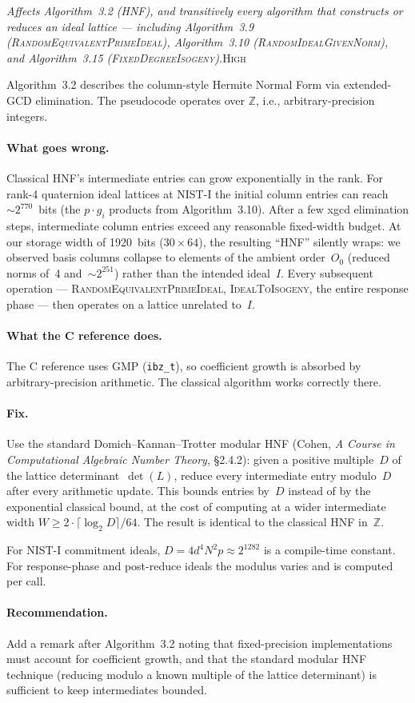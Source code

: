 \documentclass[a4paper,11pt]{article}
\newcommand{\algo}[1]{Algorithm~#1}
\newcommand{\high}{\textsc{\color{BurntOrange}High}}
\newcommand{\finding}[2]{\noindent\textit{#1}\hfill#2\par\smallskip}
\begin{document}
\finding{Affects \algo{3.2} (\textsc{HNF}), and transitively every
algorithm that constructs or reduces an ideal lattice --- including
\algo{3.9} (\textsc{RandomEquivalentPrimeIdeal}),
\algo{3.10} (\textsc{RandomIdealGivenNorm}), and
\algo{3.15} (\textsc{FixedDegreeIsogeny}).}{\high}

\algo{3.2} describes the column-style Hermite Normal Form via
extended-GCD elimination.  The pseudocode operates over
$\mathbb{Z}$, i.e., arbitrary-precision integers.

\paragraph{What goes wrong.}
Classical HNF's intermediate entries can grow exponentially in
the rank.  For rank-4 quaternion ideal lattices at NIST-I the
initial column entries can reach ${\sim}2^{770}$~bits (the
$p \cdot g_i$ products from \algo{3.10}).  After a few xgcd
elimination steps, intermediate column entries exceed any
reasonable fixed-width budget.  At our storage width of 1920~bits
($30 \times 64$), the resulting ``HNF'' silently wraps: we
observed basis columns collapse to elements of the ambient
order~$O_0$ (reduced norms of~4 and~${\sim}2^{251}$) rather
than the intended ideal~$I$.  Every subsequent operation ---
\textsc{RandomEquivalentPrimeIdeal}, \textsc{IdealToIsogeny},
the entire response phase --- then operates on a lattice unrelated
to~$I$.

\paragraph{What the C reference does.}
The C reference uses GMP (\texttt{ibz\_t}), so coefficient growth
is absorbed by arbitrary-precision arithmetic.  The classical
algorithm works correctly there.

\paragraph{Fix.}
Use the standard Domich--Kannan--Trotter modular HNF (Cohen,
\emph{A Course in Computational Algebraic Number Theory},
\S2.4.2): given a positive multiple~$D$ of the lattice
determinant~$\det(L)$, reduce every intermediate entry modulo~$D$
after every arithmetic update.  This bounds entries by~$D$ instead
of by the exponential classical bound, at the cost of computing
at a wider intermediate width $W \geq 2 \cdot
\lceil\log_2 D\rceil / 64$.  The result is identical to the
classical HNF in~$\mathbb{Z}$.

For NIST-I commitment ideals, $D = 4 d^4 N^2 p \approx 2^{1282}$
is a compile-time constant.  For response-phase and post-reduce
ideals the modulus varies and is computed per call.

\paragraph{Recommendation.}
Add a remark after \algo{3.2} noting that fixed-precision
implementations must account for coefficient growth, and that the
standard modular HNF technique (reducing modulo a known multiple
of the lattice determinant) is sufficient to keep intermediates
bounded.
\end{document}
